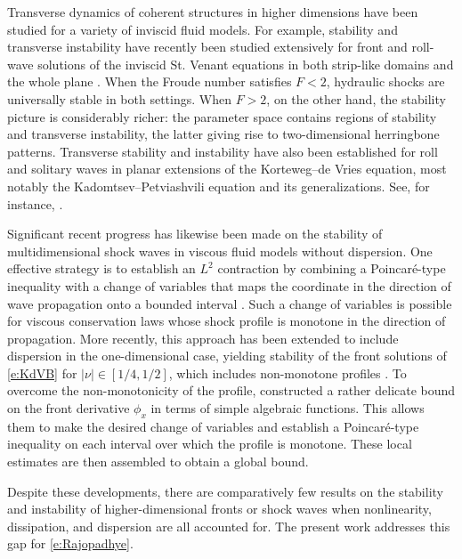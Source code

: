 \documentclass[final,11pt]{article}
\theoremstyle{definition} %
\theoremstyle{plain}
\theoremstyle{definition} %
\theoremstyle{remark}
\begin{document}
Transverse dynamics of coherent structures in higher dimensions have been studied for a variety of inviscid fluid models. 
For example, stability and transverse instability have recently been studied extensively for front and roll-wave solutions of the inviscid St. Venant equations in both strip-like domains and the whole plane \cite{yang2025multidimensional}. When the Froude number satisfies $F<2$, hydraulic shocks are universally stable in both settings. When $F>2$, on the other hand, the stability picture is considerably richer: the parameter space contains regions of stability and transverse instability, the latter giving rise to two-dimensional herringbone patterns. Transverse stability and instability have also been established for roll and solitary waves in planar extensions of the Korteweg--de Vries equation, most notably the Kadomtsev--Petviashvili equation and its generalizations. See, for instance, \cite{bhavna2022transverse,haragus2017transverse,johnson2010transverse,spektor1988transverse}. 

Significant recent progress has likewise been made on the stability of multidimensional shock waves in viscous fluid models without dispersion. One effective strategy is to establish an $L^2$ contraction by combining a Poincar{\'e}-type inequality with a change of variables that maps the coordinate in the direction of wave propagation onto a bounded interval \cite{kang2025multiDburgers,wangNSviscous2024}. Such a change of variables is possible for viscous conservation laws whose shock profile is monotone in the direction of propagation. More recently, this approach has been extended to include dispersion in the one-dimensional case, yielding stability of the front solutions of \eqref{e:KdVB} for $|\nu|\in[1/4,1/2]$, which includes non-monotone profiles \cite{chen2026}. To overcome the non-monotonicity of the profile, \cite{chen2026} constructed a rather delicate bound on the front derivative $\phi_x$ in terms of simple algebraic functions. This allows them to make the desired change of variables and establish a Poincar{\'e}-type inequality on each interval over which the profile is monotone. These local estimates are then assembled to obtain a global bound. 

Despite these developments, there are comparatively few results on the stability and instability of higher-dimensional fronts or shock waves when nonlinearity, dissipation, and dispersion are all accounted for. The present work addresses this gap for \eqref{e:Rajopadhye}.
\end{document}
